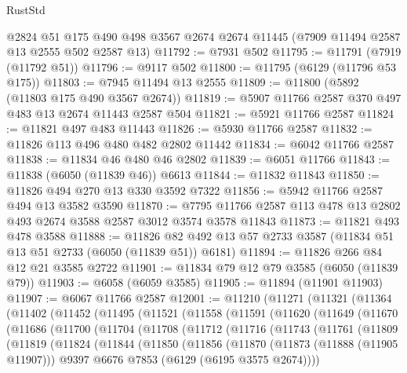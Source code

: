\begin{lexlean}{RustStd}
\begin{coremodule}
    @2824
    @51
    @175
    @490
    @498
    @3567
    @2674
    @2674
    @11445
    (@7909 @11494 @2587 @13 @2555 @502 @2587 @13)
@11792 := @7931 @502
@11795 := @11791 (@7919 (@11792 @51))
@11796 := @9117 @502
@11800 := @11795 (@6129 (@11796 @53 @175))
@11803 := @7945 @11494 @13 @2555
@11809 := @11800 (@5892 (@11803 @175 @490 @3567 @2674))
@11819 := @5907 @11766 @2587 @370 @497 @483 @13 @2674 @11443 @2587 @504
@11821 := @5921 @11766 @2587
@11824 := @11821 @497 @483 @11443
@11826 := @5930 @11766 @2587
@11832 := @11826 @113 @496 @480 @482 @2802 @11442
@11834 := @6042 @11766 @2587
@11838 := @11834 @46 @480 @46 @2802
@11839 := @6051 @11766
@11843 := @11838 (@6050 (@11839 @46)) @6613
@11844 := @11832 @11843
@11850 := @11826 @494 @270 @13 @330 @3592 @7322
@11856 := @5942 @11766 @2587 @494 @13 @3582 @3590
@11870 := @7795 @11766 @2587 @113 @478 @13 @2802 @493 @2674 @3588 @2587 @3012 @3574 @3578 @11843
@11873 := @11821 @493 @478 @3588
@11888 := @11826 @82 @492 @13 @57 @2733 @3587 (@11834 @51 @13 @51 @2733 (@6050 (@11839 @51)) @6181)
@11894 := @11826 @266 @84 @12 @21 @3585 @2722
@11901 := @11834 @79 @12 @79 @3585 (@6050 (@11839 @79))
@11903 := @6058 (@6059 @3585)
@11905 := @11894 (@11901 @11903)
@11907 := @6067 @11766 @2587
@12001 := @11210
    (@11271
      (@11321
        (@11364
          (@11402
            (@11452
              (@11495
                (@11521
                  (@11558
                    (@11591
                      (@11620
                        (@11649
                          (@11670
                            (@11686
                              (@11700
                                (@11704
                                  (@11708
                                    (@11712
                                      (@11716
                                        (@11743
                                          (@11761
                                            (@11809
                                              (@11819
                                                (@11824
                                                  (@11844
                                                    (@11850
                                                      (@11856
                                                        (@11870
                                                          (@11873 (@11888 (@11905 @11907)))
                                                          @9397
                                                          @6676
                                                          @7853
                                                          (@6129 (@6195 @3575 @2674))))

\end{coremodule}
\end{lexlean}
